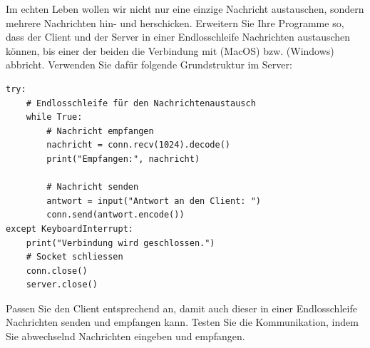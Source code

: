 \begin{myexercise}\label{ex:endlos-chat}
    Im echten Leben wollen wir nicht nur eine einzige Nachricht austauschen, sondern mehrere Nachrichten hin- und herschicken. Erweitern Sie Ihre Programme so, dass der Client und der Server in einer Endlosschleife Nachrichten austauschen können, bis einer der beiden die Verbindung mit  (MacOS) bzw.  (Windows) abbricht. Verwenden Sie dafür folgende Grundstruktur im Server:
    \begin{lstlisting}
try:
    # Endlosschleife für den Nachrichtenaustausch
    while True:
        # Nachricht empfangen
        nachricht = conn.recv(1024).decode()
        print("Empfangen:", nachricht)

        # Nachricht senden
        antwort = input("Antwort an den Client: ")
        conn.send(antwort.encode())
except KeyboardInterrupt:
    print("Verbindung wird geschlossen.")
    # Socket schliessen
    conn.close()
    server.close()
\end{lstlisting}

    Passen Sie den Client entsprechend an, damit auch dieser in einer Endlosschleife Nachrichten senden und empfangen kann. Testen Sie die Kommunikation, indem Sie abwechselnd Nachrichten eingeben und empfangen.
\end{myexercise}

